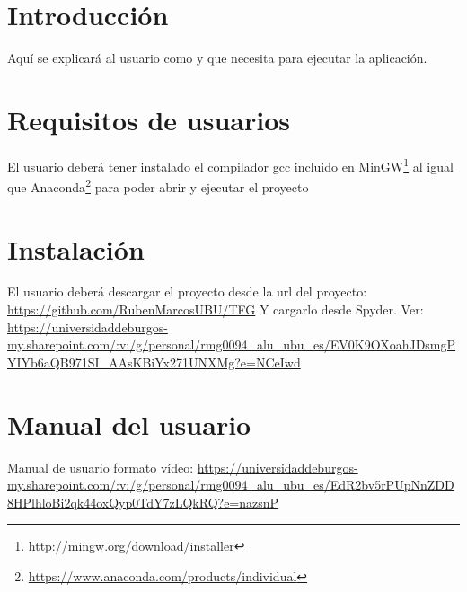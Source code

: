 
\section{Introducción}

Aquí se explicará al usuario como y que necesita para ejecutar la aplicación.

\section{Requisitos de usuarios}

El usuario deberá tener instalado el compilador gcc incluido en MinGW\footnote{\url{http://mingw.org/download/installer}} al igual que Anaconda\footnote{\url{https://www.anaconda.com/products/individual}} para poder abrir y ejecutar el proyecto

\section{Instalación}

El usuario deberá descargar el proyecto desde la url del proyecto: \url{https://github.com/RubenMarcosUBU/TFG}
Y cargarlo desde Spyder.
Ver: \url{https://universidaddeburgos-my.sharepoint.com/:v:/g/personal/rmg0094_alu_ubu_es/EV0K9OXoahJDsmgPYIYb6aQB971SI_AAsKBiYx271UNXMg?e=NCeIwd}

\section{Manual del usuario}

Manual de usuario formato vídeo: \url{https://universidaddeburgos-my.sharepoint.com/:v:/g/personal/rmg0094_alu_ubu_es/EdR2bv5rPUpNnZDD8HPlhloBi2qk44oxQyp0TdY7zLQkRQ?e=nazsnP}